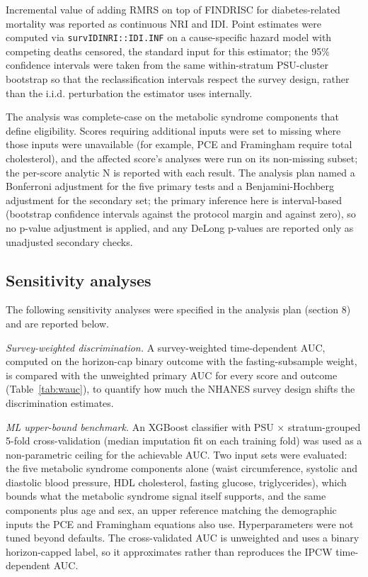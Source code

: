 \documentclass[11pt]{article}
\begin{document}
Incremental value of adding RMRS on top of FINDRISC for diabetes-related mortality was reported as continuous NRI \citep{pencina2008nri} and IDI. Point estimates were computed via \texttt{survIDINRI::IDI.INF} on a cause-specific hazard model with competing deaths censored, the standard input for this estimator; the 95\% confidence intervals were taken from the same within-stratum PSU-cluster bootstrap so that the reclassification intervals respect the survey design, rather than the i.i.d. perturbation the estimator uses internally.

The analysis was complete-case on the metabolic syndrome components that define eligibility. Scores requiring additional inputs were set to missing where those inputs were unavailable (for example, PCE and Framingham require total cholesterol), and the affected score's analyses were run on its non-missing subset; the per-score analytic N is reported with each result. The analysis plan named a Bonferroni adjustment for the five primary tests and a Benjamini-Hochberg adjustment for the secondary set; the primary inference here is interval-based (bootstrap confidence intervals against the protocol margin and against zero), so no p-value adjustment is applied, and any DeLong p-values are reported only as unadjusted secondary checks.

\subsection*{Sensitivity analyses}

The following sensitivity analyses were specified in the analysis plan (section 8) and are reported below.

\emph{Survey-weighted discrimination.} A survey-weighted time-dependent AUC, computed on the horizon-cap binary outcome with the fasting-subsample weight, is compared with the unweighted primary AUC for every score and outcome (Table~\ref{tab:wauc}), to quantify how much the NHANES survey design shifts the discrimination estimates.

\emph{ML upper-bound benchmark.} An XGBoost classifier with PSU $\times$ stratum-grouped 5-fold cross-validation (median imputation fit on each training fold) was used as a non-parametric ceiling for the achievable AUC. Two input sets were evaluated: the five metabolic syndrome components alone (waist circumference, systolic and diastolic blood pressure, HDL cholesterol, fasting glucose, triglycerides), which bounds what the metabolic syndrome signal itself supports, and the same components plus age and sex, an upper reference matching the demographic inputs the PCE and Framingham equations also use. Hyperparameters were not tuned beyond defaults. The cross-validated AUC is unweighted and uses a binary horizon-capped label, so it approximates rather than reproduces the IPCW time-dependent AUC.
\end{document}
